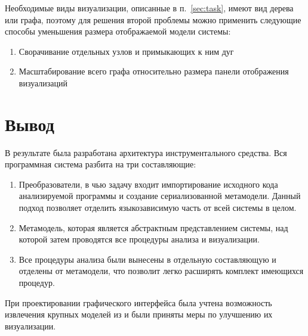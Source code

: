Необходимые виды визуализации, описанные в п.~\ref{sec:task}, имеют вид дерева
или графа, поэтому для решения второй проблемы можно применить следующие способы
уменьшения размера отображаемой модели системы:

\begin{enumerate}
    \item Сворачивание отдельных узлов и примыкающих к ним дуг
    \item Масштабирование всего графа относительно размера панели отображения
    визуализаций
\end{enumerate}

\section{Вывод}

В результате была разработана архитектура инструментального средства. Вся
программная система разбита на три составляющие:

\begin{enumerate}
    \item Преобразователи, в чью задачу входит импортирование исходного кода
    анализируемой программы и создание сериализованной метамодели. Данный
    подход позволяет отделить языкозависимую часть от всей системы в целом.
    \item Метамодель, которая является абстрактным представлением системы, над
    которой затем проводятся все процедуры анализа и визуализации.
    \item Все процедуры анализа были вынесены в отдельную составляющую и
    отделены от метамодели, что позволит легко расширять комплект имеющихся
    процедур.
\end{enumerate}

При проектировании графического интерфейса была учтена возможность извлечения
крупных моделей из и были приняты меры по улучшению их визуализации.
